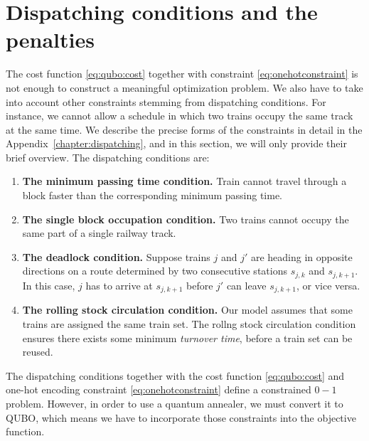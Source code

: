 \section{Dispatching conditions and the penalties}
The cost function \eqref{eq:qubo:cost} together with constraint
\eqref{eq:onehotconstraint} is not enough to construct a meaningful
optimization problem. We also have to take into account other constraints
stemming from dispatching conditions. For instance, we cannot allow a schedule
in which two trains occupy the same track at the same time. We describe the
precise forms of the constraints in detail in the
Appendix~\ref{chapter:dispatching}, and in this section, we will only provide
their brief overview. The dispatching conditions are:
\begin{enumerate}
  \item \textbf{The minimum passing time condition.} Train cannot travel through a block faster than the corresponding minimum passing time.
  \item \textbf{The single block occupation condition.} Two trains cannot occupy the same part of a single railway track.
  \item \textbf{The deadlock condition.} Suppose trains $j$ and $j'$ are
    heading in opposite directions on a route determined by two consecutive
    stations $s_{j,k}$ and $s_{j,k+1}$. In this case, $j$ has to arrive at $s_{j,k+1}$ before $j'$ can leave $s_{j,k+1}$, or vice versa.
  \item \textbf{The rolling stock circulation condition.} Our model assumes that some trains are assigned the same train set. The rollng stock circulation condition ensures there exists some minimum \emph{turnover time}, before a train set can be reused.
\end{enumerate}

The dispatching conditions together with the cost function \eqref{eq:qubo:cost}
and one-hot encoding constraint \eqref{eq:onehotconstraint} define a
constrained $0-1$ problem. However, in order to use a quantum annealer, we must
convert it to QUBO, which means we have to incorporate those constraints into
the objective function.

